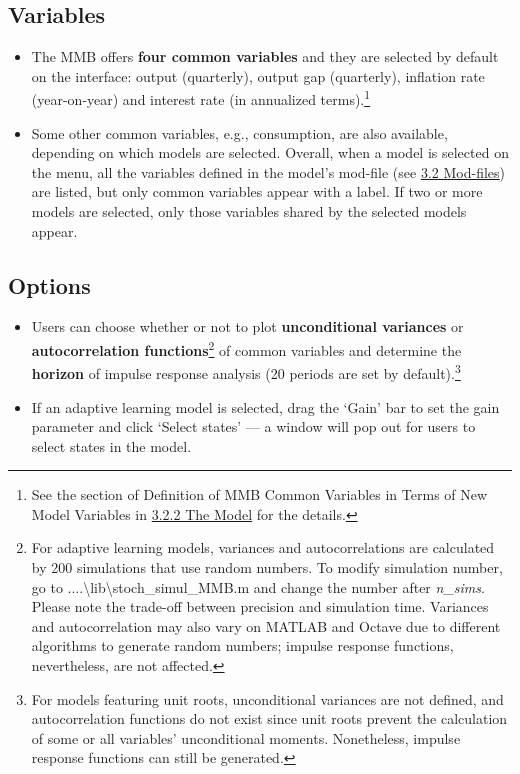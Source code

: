 \documentclass[10pt,a4paper]{article}
\begin{document}
\subsection{Variables}
\label{sec:Var}
\medskip

\begin{itemize}
\item The MMB offers \textbf{four common variables} and they are selected by default on the interface: output (quarterly), output gap (quarterly), inflation rate (year-on-year) and interest rate (in annualized terms).\footnote{See the section of Definition of MMB Common Variables in Terms of New Model Variables in \hyperref[sec:Model]{3.2.2 The Model} for the details.}

\item Some other common variables, e.g., consumption, are also available, depending on which models are selected. Overall, when a model is selected on the menu, all the variables defined in the model’s mod-file (see \hyperref[sec:Mod]{3.2 Mod-files}) are listed, but only common variables appear with a label. If two or more models are selected, only those variables shared by the selected models appear.
\end{itemize}

\subsection{Options}
\medskip

\begin{itemize}
\item Users can choose whether or not to plot \textbf{unconditional variances} or \textbf{autocorrelation functions}\footnote{For adaptive learning models, variances and autocorrelations are calculated by 200 simulations that use random numbers. To modify simulation number, go to ....\textbackslash lib\textbackslash stoch\_simul\_MMB.m and change the number after \textit{n\_sims}. Please note the trade-off between precision and simulation time. Variances and autocorrelation may also vary on MATLAB and Octave due to different algorithms to generate random numbers; impulse response functions, nevertheless, are not affected.} of common variables and determine the \textbf{horizon} of impulse response analysis (20 periods are set by default).\footnote{For models featuring unit roots, unconditional variances are not defined, and autocorrelation functions do not exist since unit roots prevent the calculation of some or all variables’ unconditional moments. Nonetheless, impulse response functions can still be generated.} 

\item If an adaptive learning model is selected, drag the ‘Gain’ bar to set the gain parameter and click ‘Select states’ — a window will pop out for users to select states in the model.
\end{itemize}
\end{document}
